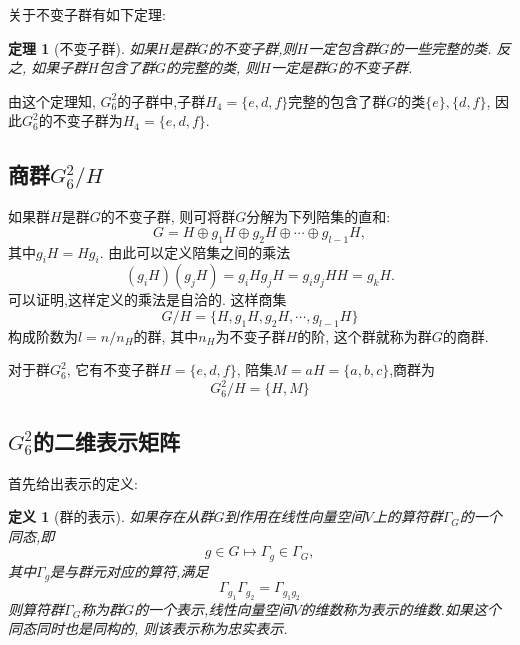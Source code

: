 \documentclass[UTF8]{ctexart}
\newtheorem{thm}{定理}
\newtheorem{define}{定义}
\begin{document}
关于不变子群有如下定理: 
\begin{thm}[不变子群]
如果$H$是群$G$的不变子群,则$H$一定包含群$G$的一些完整的类. 反之, 如果子群$H$包含了群$G$的完整的类, 则$H$一定是群$G$的不变子群. 
\end{thm}

由这个定理知, $G_6^2$的子群中,子群$H_4 = \{e, d, f\}$完整的包含了群$G$的类$\{e\}, \{d, f\}$, 因此$G_6^2$的不变子群为$H_4 = \{e, d, f\}$.

\subsection{商群$G_6^2 / H$}
如果群$H$是群$G$的不变子群, 则可将群$G$分解为下列陪集的直和:
\begin{equation}
G = H \oplus g_1 H \oplus g_2 H \oplus \cdots \oplus g_{l-1}H,
\end{equation}
其中$g_i H = H g_i$. 由此可以定义陪集之间的乘法
\begin{equation}
(g_i H)(g_j H) = g_i H g_j H = g_i g_j H H = g_k H.
\end{equation}
可以证明,这样定义的乘法是自洽的. 这样商集
\begin{equation}
G / H = \{H, g_1 H, g_2 H, \cdots , g_{l-1} H\}
\end{equation}
构成阶数为$l = n / n_H$的群, 其中$n_H$为不变子群$H$的阶, 这个群就称为群$G$的商群.

对于群$G_6^2$, 它有不变子群$H = \{e, d, f\}$, 陪集$M = a H = \{a, b, c\}$,商群为
\begin{equation}
G_6^2 / H = \{H,M\}
\end{equation}

\subsection{$G_6^2$的二维表示矩阵}
首先给出表示的定义:
\begin{define}[群的表示]
如果存在从群$G$到作用在线性向量空间$V$上的算符群$\varGamma_G$的一个同态,即
\begin{equation}
g \in G \mapsto \varGamma_g \in \varGamma_G,
\end{equation}
其中$\varGamma_g$是与群元对应的算符,满足
\begin{equation}
\varGamma_{g_1}\varGamma_{g_2} = \varGamma_{g_1 g_2}
\end{equation}
则算符群$\varGamma_G$称为群$G$的一个表示,线性向量空间$V$的维数称为表示的维数.如果这个同态同时也是同构的, 则该表示称为忠实表示.
\end{define}
\end{document}
